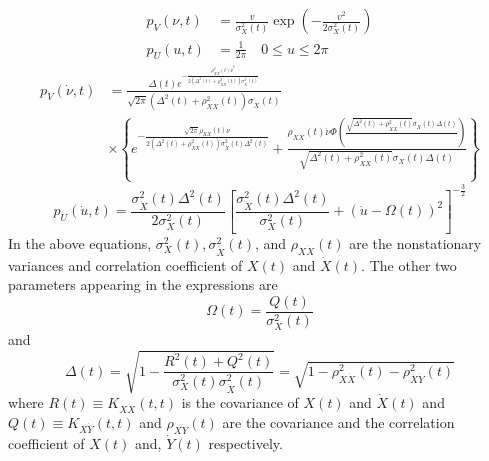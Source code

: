 \documentclass{article}
\begin{document}
\begin{align}
  p_V (\nu, t) & = \frac{v}{\sigma_X^2 (t)} \exp \left( - \frac{v^2}{2
  \sigma_X^2 (t)} \right)  \label{eq:59}\\
  p_U (u, t) & = \frac{1}{2 \pi}  \quad 0 \leqslant u \leqslant 2 \pi 
  \label{eq:60}
\end{align}
\begin{equation}
  \begin{array}{ll}
    p_{\dot{V}} (\dot{\nu}, t) & = \frac{\Delta (t) e^{- \frac{\rho_{X
    \dot{X}}^2 (t)  \dot{\nu}^2}{2 (\Delta^2 (t) + \rho_{X \dot{X}}^2 (t))
    \sigma_{\dot{X}}^2 (t)}}}{\sqrt{2 \pi}  (\Delta^2 (t) + \rho_{X \dot{X}}^2
    (t)) \sigma_{\dot{X}} (t)} \\
    & \times \left\{ e^{- \frac{\sqrt{2 \pi} \rho_{X \dot{X}} (t)
    \dot{\nu}}{2 (\Delta^2 (t) + \rho_{X \dot{X}}^2 (t)) \sigma_{\dot{X}}^2
    (t) \Delta^2 (t)}} + \frac{\rho_{X \dot{X}} (t) \dot{\nu} \Phi \left(
    \frac{\sqrt{\Delta^2 (t) + \rho_{X \dot{X}}^2 (t)} \sigma_{\dot{X}} (t)
    \Delta (t)}{} \right)}{\sqrt{\Delta^2 (t) + \rho_{X \dot{X}}^2 (t)}
    \sigma_{\dot{X}} (t) \Delta (t)} \right\}
  \end{array} \label{eq:61}
\end{equation}
\begin{equation}
  p_{\dot{U}} (\dot{u}, t) = \frac{\sigma_{\dot{X}}^2 (t) \Delta^2 (t)}{2
  \sigma_X^2 (t)}  \left[ \frac{\sigma_{\dot{X}}^2 (t) \Delta^2
  (t)}{\sigma_X^2 (t)} + (\dot{u} - \Omega (t))^2 \right]^{- \frac{3}{2}}
  \label{eq:62}
\end{equation}
In the above equations, $\sigma_X^2 (t), \sigma_{\dot{X}}^2 (t)$, and $\rho_{X
\dot{X}} (t)$ are the nonstationary variances and correlation coefficient of
$X (t)$ and $\dot{X} (t)$. The other two parameters appearing in the
expressions are
\begin{equation}
  \Omega (t) = \frac{Q (t)}{\sigma_X^2 (t)} \label{eq:63}
\end{equation}
and
\begin{equation}
  \Delta (t) = \sqrt{1 - \frac{R^2 (t) + Q^2 (t)}{\sigma_X^2 (t)
  \sigma_{\dot{X}}^2 (t)}} = \sqrt{1 - \rho_{X \dot{X}}^2 (t) - \rho_{X
  \dot{Y}}^2 (t)} \label{eq:64}
\end{equation}
where $R (t) \equiv K_{X \dot{X}} (t, t)$ is the covariance of $X (t)$ and
$\dot{X} (t)$ and $Q (t) \equiv K_{X \dot{Y}} (t, t)$ and $\rho_{X \dot{Y}}
(t)$ are the covariance and the correlation coefficient of $X (t)$ and,
$\dot{Y} (t)$ respectively.
\end{document}
